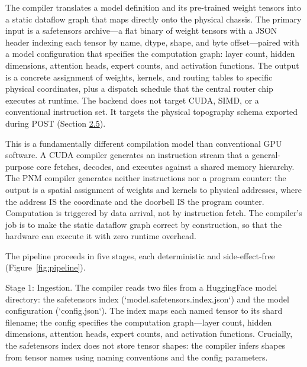 \documentclass[10pt,twocolumn]{article}
\begin{document}
The compiler translates a model definition and its pre-trained weight tensors into a static dataflow graph that maps directly onto the physical chassis. The primary input is a safetensors archive---a flat binary of weight tensors with a JSON header indexing each tensor by name, dtype, shape, and byte offset---paired with a model configuration that specifies the computation graph: layer count, hidden dimensions, attention heads, expert counts, and activation functions. The output is a concrete assignment of weights, kernels, and routing tables to specific physical coordinates, plus a dispatch schedule that the central router chip executes at runtime. The backend does not target CUDA, SIMD, or a conventional instruction set. It targets the physical topography schema exported during POST (Section \hyperref[sec:2.5]{2.5}).

This is a fundamentally different compilation model than conventional GPU software. A CUDA compiler generates an instruction stream that a general-purpose core fetches, decodes, and executes against a shared memory hierarchy. The PNM compiler generates neither instructions nor a program counter: the output is a spatial assignment of weights and kernels to physical addresses, where the address IS the coordinate and the doorbell IS the program counter. Computation is triggered by data arrival, not by instruction fetch. The compiler's job is to make the static dataflow graph correct by construction, so that the hardware can execute it with zero runtime overhead.

The pipeline proceeds in five stages, each deterministic and side-effect-free (Figure~\ref{fig:pipeline}).

Stage 1: Ingestion. The compiler reads two files from a HuggingFace model directory: the safetensors index (`model.safetensors.index.json`) and the model configuration (`config.json`). The index maps each named tensor to its shard filename; the config specifies the computation graph---layer count, hidden dimensions, attention heads, expert counts, and activation functions. Crucially, the safetensors index does not store tensor shapes: the compiler infers shapes from tensor names using naming conventions and the config parameters.
\end{document}
